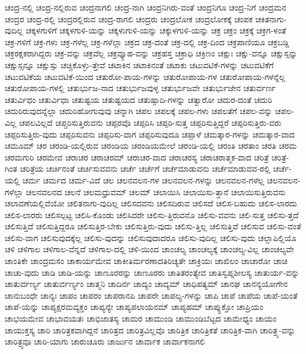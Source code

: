 {ಚಂದ್ರ-ನಲ್ಲಿ
ಚಂದ್ರ-ನಲ್ಲಿರುವ
ಚಂದ್ರನಾಗಲಿ
ಚಂದ್ರ-ನಾಗಿ
ಚಂದ್ರನಿಗಿರು-ವಂತೆ
ಚಂದ್ರನಿಗೂ
ಚಂದ್ರ-ನಿಗೆ
ಚಂದ್ರಮನ
ಚಂದ್ರರ
ಚಂದ್ರ-ರಲ್ಲಿ
ಚಂದ್ರರಲ್ಲಿರುವ
ಚಂದ್ರ-ರಾಗಲಿ
ಚಂದ್ರರು
ಚಂದ್ರಲೋಕ
ಚಂದ್ರಲೋಕಕ್ಕೆ
ಚಂಪಕ
ಚಕಿತನಾಗು-ವುದಿಲ್ಲ
ಚಕ್ಕಳಗುಳಿಗೆ
ಚಕ್ಕಳಗುಳಿ-ಯನ್ನು
ಚಕ್ಕಳುಗುಳಿ-ಯನ್ನು
ಚಕ್ಕುಳಗುಳಿ-ಯನ್ನು
ಚಕ್ರ
ಚಕ್ರಂ
ಚಕ್ರಕ್ಕೆ
ಚಕ್ರಗ-ಳಂತೆ
ಚಕ್ರ-ಗಳಿಗೆ
ಚಕ್ರ-ಗಳು
ಚಕ್ರ-ಗಳೆಲ್ಲ
ಚಕ್ರ-ಗಳೆಲ್ಲಾ
ಚಕ್ರದ
ಚಕ್ರ-ದಂತೆ
ಚಕ್ರ-ದಲ್ಲಿ
ಚಕ್ರ-ದಿಂದ
ಚಕ್ರಪಾಣಿಯೂ
ಚಕ್ರಬಡ್ಡಿ
ಚಕ್ರರಕ್ಷಕರಾಗಿದ್ದರು
ಚಕ್ರ-ವನ್ನು
ಚಕ್ರವೆಲ್ಲ
ಚಕ್ರವ್ಯೂಹ-ವನ್ನು
ಚಕ್ರಹಸ್ತ
ಚಕ್ರಾಧಿ
ಚಕ್ರಿಣಂ
ಚಕ್ಷುಃ
ಚಕ್ಷು-ವನ್ನೂ
ಚಕ್ಷುಸ್ಸನ್ನು
ಚಕ್ಷುಸ್ಸನ್ನೂ
ಚಕ್ಷುಸ್ಸು
ಚಚ್ಚಿಕೊಳ್ಳು-ತ್ತೇವೆ
ಚಟಾಕಿನ
ಚಟಾಕಿನಂತೆ
ಚಟಾಕು
ಚಟುವಟಿಕೆ-ಗಳನ್ನು
ಚಟುವಟಿಕೆಗೆ
ಚಟುವಟಿಕೆಯ
ಚಟುವಟಿಕೆ-ಯಿಂದ
ಚತುರೋ-ಪಾಯ-ಗಳನ್ನು
ಚತುರೋಪಾಯ-ಗಳ
ಚತುರೋಪಾಯ-ಗಳನ್ನೆಲ್ಲ
ಚತುರೋಪಾಯ-ಗಳಲ್ಲಿ
ಚತುರ್ಭುಜ-ನಾದ
ಚತುರ್ಭುಜವುಳ್ಳ
ಚತುರ್ಭುಜವೇ
ಚತುರ್ಭುಜೇನ
ಚತುರ್ವರ್ಣ
ಚತುರ್ವಿಧಂ
ಚತುರ್ವಿಧಾ
ಚತುಷ್ಟಯ
ಚತುಷ್ಟಯದ
ಚತುಷ್ಪಾದಿ-ಗಳನ್ನು
ಚತ್ವಾರೋ
ಚದುರ-ದಂತೆ
ಚದುರಿ
ಚದುರಿರುವುದನ್ನೆಲ್ಲಾ
ಚದುರಿಹೋಗುವುವು
ಚನ್ನಾಗಿ
ಚಪಲ
ಚಪಲಕ್ಕೆ
ಚಪಲ-ಗಳು
ಚಪಲತೆಗೆ
ಚಪಲ-ವನ್ನು
ಚಪಲ-ವಿಲ್ಲ
ಚಪಲವಿಲ್ಲದೆ
ಚಪ್ಚರಿಸುತ್ತಿರುವನು
ಚಪ್ಪರವೊ
ಚಪ್ಪರಿಸಿ
ಚಪ್ಪರಿ-ಸುತ್ತ
ಚಪ್ಪರಿಸುತ್ತಿದ್ದರೆ
ಚಪ್ಪರಿಸುತ್ತಿರು-ವರು
ಚಪ್ಪರಿಸುತ್ತಿರು-ವುದು
ಚಪ್ಪರಿಸುವನು
ಚಪ್ಪರಿಸು-ವಾಗ
ಚಪ್ಪರಿಸುವುದೂ
ಚಪ್ಪಾಳೆ
ಚಮತ್ಕಾರ-ಗಳನ್ನು
ಚಮತ್ಕಾರ-ವಾದ
ಚಮೂಮ್
ಚರ
ಚರಂಡಿ-ಯಲ್ಲಿರುವ
ಚರಂಡಿಯ
ಚರಂಡಿಯಮೇಲೆ
ಚರಂಡಿ-ಯಲ್ಲಿ
ಚರಂತಿ
ಚರತಾಂ
ಚರತಿ
ಚರಮ
ಚರಮಗುರಿ
ಚರಮೇವ
ಚರಾಚರ
ಚರಾಚರಮ್
ಚರಾಚರ-ವಾದ
ಚರಾಚರಸ್ಯ
ಚರಾಚರಾತ್ಮಕ-ವಾದ
ಚರಿತ್ರೆ
ಚರಿತ್ರೆ-ಗಿಂತ
ಚರಿತ್ರೆಯ
ಚರ್ಚಿನಂತೆ
ಚರ್ಚಿಸುವವನು
ಚರ್ಚೆ
ಚರ್ಚೆಗೆ
ಚರ್ಚೆಮಾಡುವನು
ಚರ್ಚೆಮಾಡುವವ-ರಲ್ಲಿ
ಚರ್ಚೆ-ಯಲ್ಲಿ
ಚರ್ಮ
ಚರ್ಮದ
ಚರ್ಮ-ವಿದೆ
ಚಲ
ಚಲನವಲನ-ಗಳ
ಚಲನವಲನ-ಗಳನ್ನು
ಚಲನವಲನ-ಗಳೆಲ್ಲ
ಚಲನವಲನ-ಗಳೆಲ್ಲಾ
ಚಲನವಲನದ
ಚಲನೆ
ಚಲಮಧ್ರುವಮ್
ಚಲಮ್
ಚಲಾಯಿಸಿ
ಚಲಾಯಿಸು-ತ್ತಾನೆ
ಚಲಾಯಿಸುತ್ತಿರುವನು
ಚಲಾವಣೆಯಲ್ಲಿವೆಯೋ
ಚಲಿತನಾಗು-ವುದಿಲ್ಲ
ಚಲಿಸದವನು
ಚಲಿಸದಿರುವ
ಚಲಿಸದೆ
ಚಲಿಸ-ಬಹುದು
ಚಲಿಸ-ಲಾರದು
ಚಲಿಸ-ಲಾರರು
ಚಲಿಸಲ್ಪಟ್ಟ
ಚಲಿಸಿ-ಕೊಂಡು
ಚಲಿಸಿದರೇ
ಚಲಿಸು-ತ್ತಿರುವನೊ
ಚಲಿಸು-ವವನು
ಚಲಿ-ಸುತ್ತ
ಚಲಿಸು-ತ್ತದೆ
ಚಲಿಸುತ್ತಿದೆ
ಚಲಿಸುತ್ತಿದ್ದರೂ
ಚಲಿಸುತ್ತಿರ-ಬೇಕು
ಚಲಿಸುತ್ತಿರು-ವುದು
ಚಲಿಸು-ತ್ತಿಲ್ಲ
ಚಲಿಸುತ್ತಿವೆ
ಚಲಿಸುವ
ಚಲಿಸು-ವಂತೆ
ಚಲಿಸು-ವಾಗ
ಚಲಿಸುವುದಕ್ಕೆಲ್ಲ
ಚಲಿಸು-ವುದನ್ನು
ಚಲಿಸುವುದಾದರೂ
ಚಲಿಸು-ವುದಿಲ್ಲ
ಚಲಿಸು-ವುದು
ಚಲ್ಲಾಪಿಲ್ಲಿಯೊ
ಚಳಿ
ಚಳಿಗಾಲ
ಚಳಿಗಾಲ-ವೆನ್ನದೆ
ಚಳಿಗಾಲ-ದಲ್ಲಿ
ಚಳಿ-ಯಿಂದ
ಚಾಂಚಲ್ಯ
ಚಾಂಚಲ್ಯಕ್ಕೆ
ಚಾಂಚಲ್ಯ-ವಿಲ್ಲ
ಚಾಂಚಲ್ಯವೇ
ಚಾಂತಿಕೇ
ಚಾಂದ್ರಮಸಂ
ಚಾಕಾರ್ಯಮೇವ
ಚಾಕೀತಿರ್ಮರಣಾದತಿರಿಚ್ಯತೇ
ಚಾಕ್ರಿಯಃ
ಚಾಖಿಲಂ
ಚಾಚಾರೋ
ಚಾಚಿ
ಚಾಚು-ವುದು
ಚಾಡಿ
ಚಾಡಿ-ಯನ್ನು
ಚಾಣೂರರನ್ನು
ಚಾಣೂರರು
ಚಾತಿತರಂತ್ಯೇವ
ಚಾತಿಸ್ವಪ್ನಶೀಲಸ್ಯ
ಚಾತುರ್ಯ-ವನ್ನು
ಚಾತುರ್ವರ್ಣ್ಯ
ಚಾತುರ್ವರ್ಣ್ಯಂ
ಚಾತ್ಮನಿ
ಚಾದಿರ್ನ
ಚಾದ್ಯಂ
ಚಾದ್ಯಮ್
ಚಾಧಿಪತ್ಯಮ್
ಚಾನಘ
ಚಾನನ್ಯಯೋಗೇನ
ಚಾನುಬಂಧೇ
ಚಾನ್ಯಃ
ಚಾಪಂ
ಚಾಪರಂ
ಚಾಪರಾನಪಿ
ಚಾಪರೇ
ಚಾಪಲ್ಯ-ಗಳನ್ನು
ಚಾಪಿ
ಚಾಪೆ
ಚಾಪೆಯ
ಚಾಪೆ-ಯಂತೆ
ಚಾಪೆ-ಯನ್ನು
ಚಾಪ್ಯಕ್ಷರಮವ್ಯಕ್ತಂ
ಚಾಪ್ಯನ್ಯೇ
ಚಾಪ್ಯಪಲಾಯನಮ್
ಚಾಪ್ಯಹಮ್
ಚಾಪ್ಯುಕ್ತೋ
ಚಾಪ್ರಿಯಂ
ಚಾಭಯಮೇವ
ಚಾಭಾವಯತಃ
ಚಾಭಿಜಾತಸ್ಯ
ಚಾಮರ
ಚಾಮುಂಡಿ
ಚಾಮುಂಡಿಬೆಟ್ಟದ
ಚಾಮೇಧ್ಯಂ
ಚಾಯಂ
ಚಾಯುಕ್ತಸ್ಯ
ಚಾರಿ
ಚಾರಿತ್ರಕವಾಗಿದ್ದನೆ
ಚಾರಿತ್ರದ
ಚಾರಿತ್ರವಿಲ್ಲವೊ
ಚಾರಿತ್ರಿಕ
ಚಾರಿತ್ರಿಕತೆ
ಚಾರಿತ್ರಿಕ-ವಾಗಿ
ಚಾರಿತ್ರ್ಯ-ವನ್ನು
ಚಾರಿತ್ರ್ಯವೂ
ಚಾರಿ-ಯಾಗು
ಚಾರುಚೂರು
ಚಾರ್ಜುನ
ಚಾರ್ವಾಕ
ಚಾರ್ವಾಕನಾಗಲಿ
}
